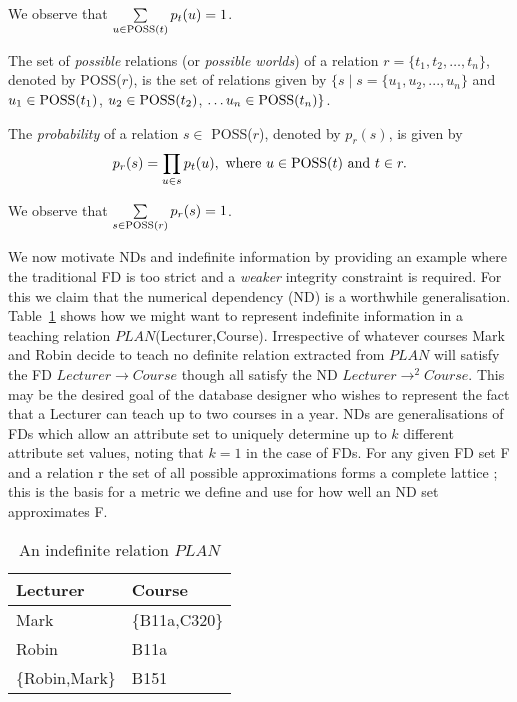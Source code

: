 We observe that $\sum\limits_{u \in {\rm POSS}(t)} p_t(u) = 1$. 

\begin{definition}
\begin{rm}
The set of {\em possible} relations (or {\em possible worlds}) 
of a relation $r = \{t_1, t_2, \ldots, t_n\}$, denoted by POSS($r$),
is the set of relations given by
$\{s \mid s = \{u_1, u_2, ..., u_n\}$ and 
$u_1 \in {\rm POSS}(t_1)$, $u_2 \in {\rm POSS}(t_2)$,
$\ldots u_n \in {\rm POSS}(t_n)\}$.

The {\em probability} of a relation $s \in$ POSS($r$),
denoted by $p_r(s)$, is given by 
\begin{displaymath}
p_r(s) = \prod_{u \in s} p_t(u), \mbox{ where } u \in {\rm POSS}(t) 
\mbox{ and } t \in r. 
\end{displaymath}
\end{rm}
\end{definition}
\medskip

We observe that $\sum\limits_{s \in {\rm POSS}(r)} p_r(s) = 1$. 


\medskip

We now motivate NDs and indefinite information by providing an example
where
the traditional FD is too strict and a {\em weaker} integrity constraint
is required. For this we claim that the numerical dependency (ND) \cite{gm85b} is a worthwhile generalisation.
Table~\ref{tbl:1.0} shows how we might
want to represent indefinite information in a teaching relation 
$PLAN$(Lecturer,Course).  Irrespective of whatever courses Mark and Robin
 decide to teach no definite relation extracted from $PLAN$
will satisfy the FD $Lecturer \to Course$ though all satisfy the 
ND $Lecturer \to^2 Course$. This may be the desired goal of the 
database designer who wishes to represent the fact that a Lecturer can
teach up to two courses in a year. NDs are generalisations of FDs which
allow an attribute set to uniquely determine up to $k$ different attribute
set values, noting that $k = 1$ in the case of FDs. For any given FD
set F and a relation r the set of all possible approximations forms a
complete lattice \cite{dp90}; this is the basis for a metric we define
and use for how well an ND set approximates F.

{\line
\begin{table}[ht]
\begin{center}
\begin{tabular}{||l|l||} \hline
Lecturer & Course \\ \hline
 Mark & \{B11a,C320\} \\
 Robin & B11a \\
 \{Robin,Mark\} & B151 \\ \hline
\end{tabular}
\end{center}
\caption{\label{tbl:1.0} An indefinite relation $PLAN$} 
\end{table}
}

